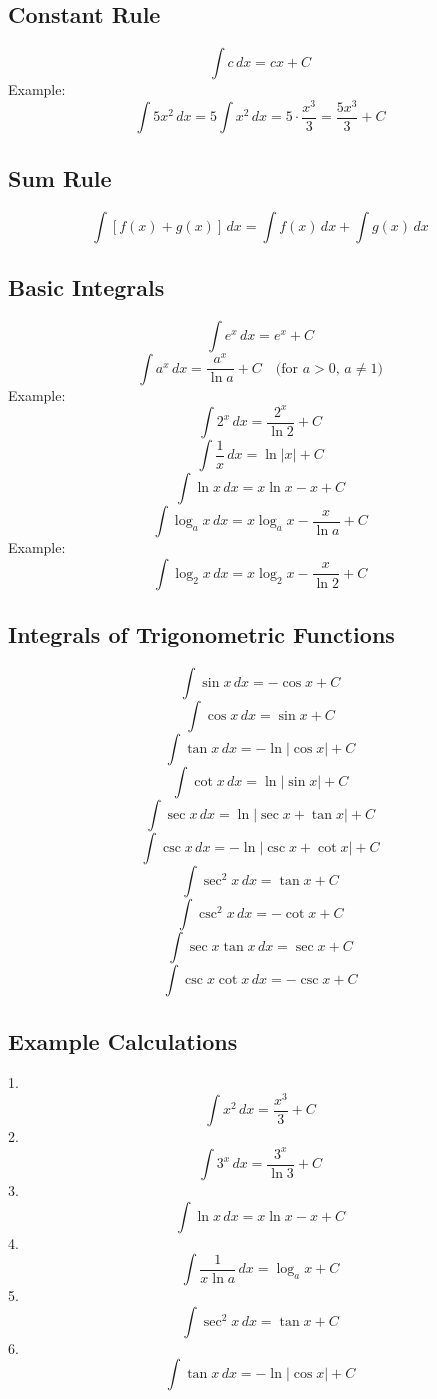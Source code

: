 \documentclass{article}
\begin{document}
\begin{multicols}{2}
\subsection*{Constant Rule}
\[
\int c \, dx = cx + C
\]
Example:
\[
\int 5x^2 \, dx = 5 \int x^2 \, dx = 5 \cdot \frac{x^3}{3} = \frac{5x^3}{3} + C
\]

\subsection*{Sum Rule}
\[
\int [f(x) + g(x)] \, dx = \int f(x) \, dx + \int g(x) \, dx
\]

\subsection*{Basic Integrals}
\[
\int e^x \, dx = e^x + C
\]
\[
\int a^x \, dx = \frac{a^x}{\ln a} + C \quad \text{(for } a > 0,\, a \neq 1\text{)}
\]
Example:
\[
\int 2^x \, dx = \frac{2^x}{\ln 2} + C
\]
\[
\int \frac{1}{x} \, dx = \ln |x| + C
\]
\[
\int \ln x \, dx = x \ln x - x + C
\]
\[
\int \log_a x \, dx = x \log_a x - \frac{x}{\ln a} + C
\]
Example:
\[
\int \log_2 x \, dx = x \log_2 x - \frac{x}{\ln 2} + C
\]

\subsection*{Integrals of Trigonometric Functions}
\[
\int \sin x \, dx = -\cos x + C
\]
\[
\int \cos x \, dx = \sin x + C
\]
\[
\int \tan x \, dx = -\ln |\cos x| + C
\]
\[
\int \cot x \, dx = \ln |\sin x| + C
\]
\[
\int \sec x \, dx = \ln |\sec x + \tan x| + C
\]
\[
\int \csc x \, dx = -\ln |\csc x + \cot x| + C
\]
\[
\int \sec^2 x \, dx = \tan x + C
\]
\[
\int \csc^2 x \, dx = -\cot x + C
\]
\[
\int \sec x \tan x \, dx = \sec x + C
\]
\[
\int \csc x \cot x \, dx = -\csc x + C
\]

\subsection*{Example Calculations}
1. \[
\int x^2 \, dx = \frac{x^3}{3} + C
\]
2. \[
\int 3^x \, dx = \frac{3^x}{\ln 3} + C
\]
3. \[
\int \ln x \, dx = x \ln x - x + C
\]
4. \[
\int \frac{1}{x \ln a} \, dx = \log_a x + C
\]
5. \[
\int \sec^2 x \, dx = \tan x + C
\]
6. \[
\int \tan x \, dx = -\ln |\cos x| + C
\]

\end{multicols}
\end{document}

